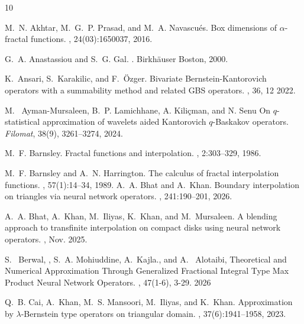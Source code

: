 \documentclass{article}[12pt, a4]
\begin{document}
		\begin{thebibliography}{10}
			
			M.~N. Akhtar, M.~G.~P. Prasad, and M.~A. Navascu\'{e}s.
			\newblock Box dimensions of $\alpha$-fractal functions.
			, 24(03):1650037, 2016.
			
			G.~A. Anastassiou and S.~G. Gal.
			.
			\newblock Birkh\"{a}user Boston, 2000.
			
			K.~Ansari, S.~Karakilic, and F.~Özger.
			\newblock Bivariate {B}ernstein-{K}antorovich operators with a summability
			method and related {GBS} operators.
			, 36, 12 2022.
			
			 M.~ Ayman-Mursaleen, B.~P. Lamichhane, A. Kiliçman, and  N. Senu  On $q$-statistical approximation of wavelets aided Kantorovich $q$-Baskakov operators. {\em Filomat}, 38(9), 3261–3274, 2024.
			
			M.~F. Barnsley.
			\newblock Fractal functions and interpolation.
			, 2:303--329, 1986.
			
			M.~F. Barnsley and A.~N. Harrington.
			\newblock The calculus of fractal interpolation functions.
			, 57(1):14--34, 1989.
			A.~A. Bhat and A.~Khan.
			\newblock Boundary interpolation on triangles via neural network operators.
			, 241:190--201, 2026.
			
			A.~A. Bhat, A.~Khan, M.~Iliyas, K.~Khan, and M.~Mursaleen.
			\newblock A blending approach to transfinite interpolation on compact disks using neural network operators.
			, Nov. 2025.
			
			S. ~Berwal, , S.~A. Mohiuddine, A.~Kajla., and  A.~ Alotaibi, \newblock Theoretical and Numerical Approximation Through Generalized Fractional Integral Type Max Product Neural Network Operators.
			, 47(1-6), 3-29. 2026
			
			Q.~B. Cai, A.~Khan, M.~S. Mansoori, M.~Iliyas, and K.~Khan.
			\newblock Approximation by $\lambda$-{B}ernstein type operators on triangular
			domain.
			, 37(6):1941--1958, 2023.
			

\end{thebibliography}
\end{document}
